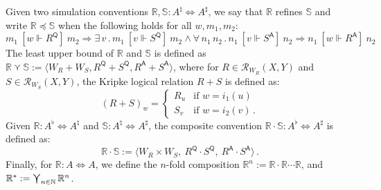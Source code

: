 \documentclass[sigplan,10pt,review,anonymous]{acmart}
\newcommand{\kw}[1]{\ensuremath{ \mathsf{#1} }}
\newcommand{\ifr}[1]{\ [{#1}]\ }
\begin{document}
\begin{definition} %
Given two simulation conventions
$\mathbb{R}, \mathbb{S} : A^\natural \Leftrightarrow A^\sharp$,
we say that
$\mathbb{R}$ refines $\mathbb{S}$ and write
$\mathbb{R} \preceq \mathbb{S}$
when the following holds for all $w, m_1, m_2$:
\[
      m_1 \ifr{w \Vdash R^\kw{Q}} m_2 \Rightarrow
      \exists \, v \,.\,
        m_1 \ifr{v \Vdash S^\kw{Q}} m_2 \wedge
        \forall \, n_1 \, n_2 \,.\,
          n_1 \ifr{v \Vdash S^\kw{A}} n_2 \Rightarrow
          n_1 \ifr{w \Vdash R^\kw{A}} n_2
\]
The least upper bound of $\mathbb{R}$ and $\mathbb{S}$
is defined as
$
    \mathbb{R} \curlyvee \mathbb{S} :=
      \langle
        W_R + W_S,
        R^\kw{Q} + S^\kw{Q},
        R^\kw{A} + S^\kw{A}
      \rangle
$,
where for $R \in \mathcal{R}_{W_R}(X,Y)$
and $S \in \mathcal{R}_{W_S}(X,Y)$,
the Kripke logical relation $R + S$ is defined as:
\[
    (R + S)_w =
    \begin{cases}
      R_u & \mbox{if } w = i_1(u) \\
      S_v & \mbox{if } w = i_2(v) \,.
    \end{cases}
\]
Given
$\mathbb{R} : A^\flat \Leftrightarrow A^\natural$ and
$\mathbb{S} : A^\natural \Leftrightarrow A^\sharp$,
the composite convention
$\mathbb{R} \cdot \mathbb{S} : A^\flat \Leftrightarrow A^\sharp$ is defined as:
\[
    \mathbb{R} \cdot \mathbb{S} :=
      \langle
        W_R \times W_S, \:
        R^\kw{Q} \cdot S^\kw{Q}, \:
        R^\kw{A} \cdot S^\kw{A}
      \rangle \,.
\]
Finally,
for $\mathbb{R} : A \Leftrightarrow A$,
we define the $n$-fold composition
$\mathbb{R}^n := \mathbb{R} \cdot \mathbb{R} \cdots \mathbb{R}$,
and
$
    \mathbb{R}^* :=
      \bigcurlyvee_{n \in \mathbb{N}} \mathbb{R}^n
$.
\end{definition}
\end{document}
